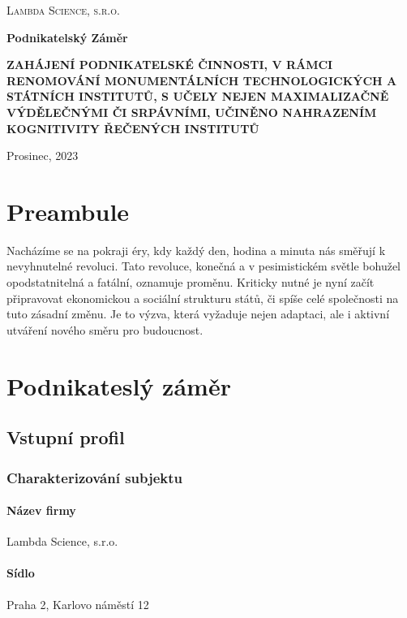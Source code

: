 \documentclass[a4paper,12pt]{report}
\begin{document}
\begin{titlepage}
    \centering
    
    {\scshape\Large Lambda Science, s.r.o. \par}
    \vspace{2cm}
    
    {\huge\bfseries Podnikatelský Záměr\par}
    \vspace{7cm}
    
    {\Large\bf 
    ZAHÁJENÍ PODNIKATELSKÉ ČINNOSTI, V RÁMCI RENOMOVÁNÍ MONUMENTÁLNÍCH TECHNOLOGICKÝCH A 
    STÁTNÍCH INSTITUTŮ, S UČELY NEJEN MAXIMALIZAČNĚ VÝDĚLEČNÝMI ČI SRPÁVNÍMI, UČINĚNO NAHRAZENÍM KOGNITIVITY ŘEČENÝCH INSTITUTŮ\par}
    \vfill
    

    {\large Prosinec, 2023\par}
\end{titlepage}

\chapter{Preambule}
Nacházíme se na pokraji éry, kdy každý den, hodina a minuta nás směřují k 
nevyhnutelné revoluci. Tato revoluce, konečná a v pesimistickém světle bohužel 
opodstatnitelná a fatální, oznamuje proměnu. Kriticky nutné je nyní začít připravovat
 ekonomickou a sociální strukturu států, či spíše celé společnosti na tuto 
 zásadní změnu. Je to výzva, která vyžaduje nejen adaptaci, ale i aktivní 
 utváření nového směru pro budoucnost.


\tableofcontents


\chapter{Podnikateslý záměr}
\section{Vstupní profil}
\subsection{Charakterizování subjektu}
\subsubsection{Název firmy}
Lambda Science, s.r.o.
\subsubsection{Sídlo}
Praha 2, Karlovo náměstí 12
\end{document}
